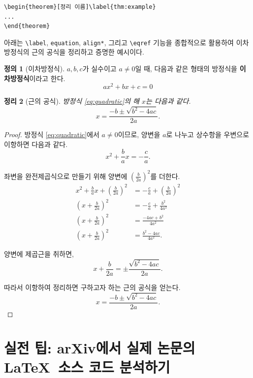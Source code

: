 \documentclass[11pt, a4paper]{article}
\theoremstyle{plain}
\newtheorem{theorem}{정리}[section]      %
\theoremstyle{definition}
\newtheorem{definition}[theorem]{정의}
\theoremstyle{remark}
\begin{document}
\begin{verbatim}
\begin{theorem}[정리 이름]\label{thm:example}
...
\end{theorem}
\end{verbatim}

아래는 \verb|\label|, \verb|equation|, \verb|align*|,
그리고 \verb|\eqref| 기능을 종합적으로 활용하여
이차방정식의 근의 공식을 정리하고 증명한 예시이다.

\begin{definition}[이차방정식]\label{def:quadratic}
$a, b, c$가 실수이고 $a \neq 0$일 때,
다음과 같은 형태의 방정식을 \textbf{이차방정식}이라고 한다.
\begin{equation}\label{eq:quadratic}
    ax^2 + bx + c = 0
\end{equation}
\end{definition}

\begin{theorem}[근의 공식]\label{thm:quadratic}
방정식 \eqref{eq:quadratic}의 해 $x$는 다음과 같다.
\[
    x = \frac{-b \pm \sqrt{b^2 - 4ac}}{2a}.
\]
\end{theorem}

\begin{proof}
방정식 \eqref{eq:quadratic}에서 $a \neq 0$이므로,
양변을 $a$로 나누고 상수항을 우변으로 이항하면 다음과 같다.
\[
    x^2 + \frac{b}{a}x = -\frac{c}{a}.
\]

좌변을 완전제곱식으로 만들기 위해
양변에 $\left(\frac{b}{2a}\right)^2$를 더한다.
\begin{align*}
    x^2 + \frac{b}{a}x + \left(\frac{b}{2a}\right)^2
    &= -\frac{c}{a} + \left(\frac{b}{2a}\right)^2 \\
    \left(x + \frac{b}{2a}\right)^2
    &= -\frac{c}{a} + \frac{b^2}{4a^2} \\
    \left(x + \frac{b}{2a}\right)^2
    &= \frac{-4ac + b^2}{4a^2} \\
    \left(x + \frac{b}{2a}\right)^2
    &= \frac{b^2 - 4ac}{4a^2}.
\end{align*}

양변에 제곱근을 취하면,
\[
    x + \frac{b}{2a}
    = \pm \frac{\sqrt{b^2 - 4ac}}{2a}.
\]

따라서 이항하여 정리하면 구하고자 하는 근의 공식을 얻는다.
\[
    x = \frac{-b \pm \sqrt{b^2 - 4ac}}{2a}.
\]
\end{proof}

\section{실전 팁: arXiv에서 실제 논문의 \LaTeX\ 소스 코드 분석하기}
\end{document}
